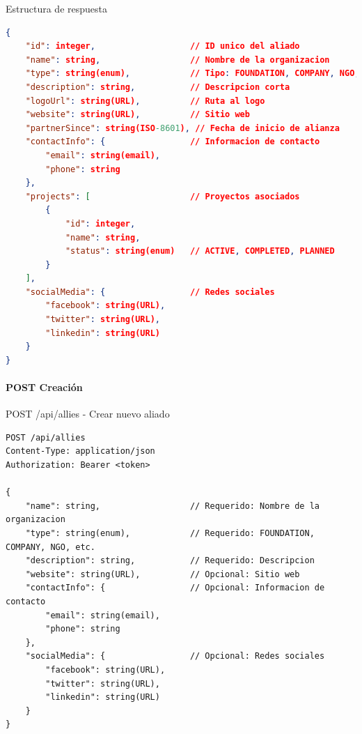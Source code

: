 \documentclass[11pt,a4paper]{article}
\begin{document}
\begin{center}
	\begin{minipage}{\textwidth}
		\begin{codebox}{Estructura de respuesta}
			\begin{lstlisting}[language=json]
{
    "id": integer,                   // ID unico del aliado
    "name": string,                  // Nombre de la organizacion
    "type": string(enum),            // Tipo: FOUNDATION, COMPANY, NGO, etc.
    "description": string,           // Descripcion corta
    "logoUrl": string(URL),          // Ruta al logo
    "website": string(URL),          // Sitio web
    "partnerSince": string(ISO-8601), // Fecha de inicio de alianza
    "contactInfo": {                 // Informacion de contacto
        "email": string(email),      
        "phone": string              
    },
    "projects": [                    // Proyectos asociados
        {
            "id": integer,
            "name": string,
            "status": string(enum)   // ACTIVE, COMPLETED, PLANNED
        }
    ],
    "socialMedia": {                 // Redes sociales
        "facebook": string(URL),
        "twitter": string(URL),
        "linkedin": string(URL)
    }
}
\end{lstlisting}
		\end{codebox}
	\end{minipage}
\end{center}

\paragraph{POST Creación}
\begin{center}
	\begin{minipage}{\textwidth}
		\begin{codebox}{POST /api/allies - Crear nuevo aliado}
			\begin{lstlisting}[language=HTTP]
POST /api/allies
Content-Type: application/json
Authorization: Bearer <token>

{
    "name": string,                  // Requerido: Nombre de la organizacion
    "type": string(enum),            // Requerido: FOUNDATION, COMPANY, NGO, etc.
    "description": string,           // Requerido: Descripcion
    "website": string(URL),          // Opcional: Sitio web
    "contactInfo": {                 // Opcional: Informacion de contacto
        "email": string(email),
        "phone": string
    },
    "socialMedia": {                 // Opcional: Redes sociales
        "facebook": string(URL),
        "twitter": string(URL),
        "linkedin": string(URL)
    }
}
\end{lstlisting}
		\end{codebox}
	\end{minipage}
\end{center}
\end{document}
